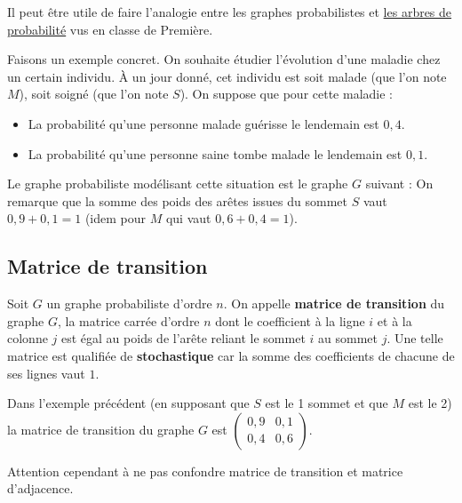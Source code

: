 	Il peut être utile de faire l'analogie entre les graphes probabilistes et \href{https://bacomathiqu.es/cours/premiere/probabilites/#arbre-de-probabilite}{les arbres de probabilité} vus en classe de Première.

	\begin{tip}[Exemple]
		Faisons un exemple concret. On souhaite étudier l'évolution d'une maladie chez un certain individu. À un jour donné, cet individu est soit malade (que l'on note $M$), soit soigné (que l'on note $S$). On suppose que pour cette maladie :
		\begin{itemize}
			\item La probabilité qu'une personne malade guérisse le lendemain est $0,4$.
			\item La probabilité qu'une personne saine tombe malade le lendemain est $0,1$.
		\end{itemize}
		Le graphe probabiliste modélisant cette situation est le graphe $G$ suivant :
		On remarque que la somme des poids des arêtes issues du sommet $S$ vaut $0,9+0,1 = 1$ (idem pour $M$ qui vaut $0,6+0,4 = 1$).
	\end{tip}

	\subsection{Matrice de transition}

	\begin{formula}[Définition]
		Soit $G$ un graphe probabiliste d'ordre $n$. On appelle \textbf{matrice de transition} du graphe $G$, la matrice carrée d'ordre $n$ dont le coefficient à la ligne $i$ et à la colonne $j$ est égal au poids de l'arête reliant le sommet $i$ au sommet $j$.
		\newpar
		Une telle matrice est qualifiée de \textbf{stochastique} car la somme des coefficients de chacune de ses lignes vaut $1$.
	\end{formula}

	\begin{tip}[Exemple]
		Dans l'exemple précédent (en supposant que $S$ est le 1\ier{} sommet et que $M$ est le 2\ieme{}) la matrice de transition du graphe $G$ est $\displaystyle{\begin{pmatrix} 0,9 & 0,1 \\ 0,4 & 0,6 \end{pmatrix}}$.
	\end{tip}

	Attention cependant à ne pas confondre matrice de transition et matrice d'adjacence.

